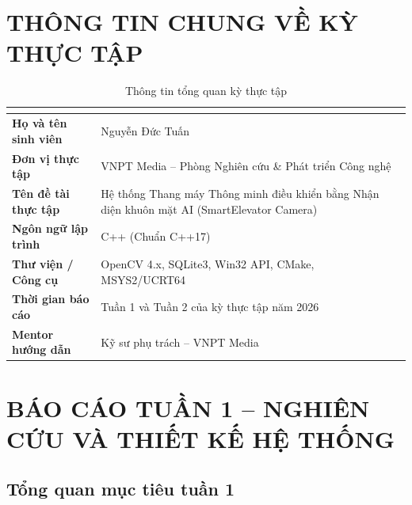 \documentclass[12pt,a4paper]{article}
\begin{document}
\newpage
{}
\tableofcontents
\newpage
{}

\section*{THÔNG TIN CHUNG VỀ KỲ THỰC TẬP}

\begin{table}[H]
    \centering
    \renewcommand{\arraystretch}{1.4}
    \begin{tabular}{|>{\bfseries}p{5cm}|p{9.5cm}|}
        \hline
        \rowcolor{lightblue}
        \multicolumn{2}{|c|}{\bfseries THÔNG TIN SINH VIÊN THỰC TẬP} \\
        \hline
        Họ và tên sinh viên   & Nguyễn Đức Tuấn \\
        \hline
        Đơn vị thực tập       & VNPT Media -- Phòng Nghiên cứu \& Phát triển Công nghệ \\
        \hline
        Tên đề tài thực tập   & Hệ thống Thang máy Thông minh điều khiển bằng Nhận diện khuôn mặt AI (SmartElevator Camera) \\
        \hline
        Ngôn ngữ lập trình    & C++ (Chuẩn C++17) \\
        \hline
        Thư viện / Công cụ    & OpenCV 4.x, SQLite3, Win32 API, CMake, MSYS2/UCRT64 \\
        \hline
        Thời gian báo cáo     & Tuần 1 và Tuần 2 của kỳ thực tập năm 2026 \\
        \hline
        Mentor hướng dẫn      & Kỹ sư phụ trách -- VNPT Media \\
        \hline
    \end{tabular}
    \caption{Thông tin tổng quan kỳ thực tập}
\end{table}

\newpage

\section{BÁO CÁO TUẦN 1 -- NGHIÊN CỨU VÀ THIẾT KẾ HỆ THỐNG}

\subsection{Tổng quan mục tiêu tuần 1}
\end{document}
